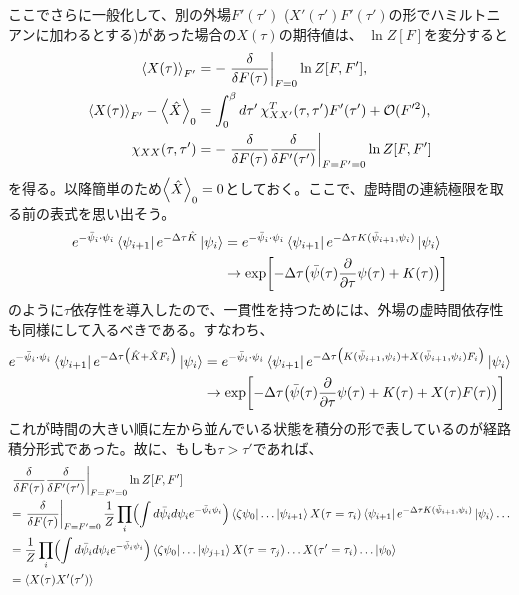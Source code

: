 \documentclass[a4paper,12pt]{jsarticle}
\newcommand{\p}{\partial}
\begin{document}
ここでさらに一般化して、別の外場$F'(\tau')$ ($X'(\tau')F'(\tau')$の形でハミルトニアンに加わるとする)があった場合の$X(\tau)$の期待値は、
$\ln Z[F]$を変分すると
\begin{align}
  \ev{X(\tau)}_{F'} &= -\left.\frac{\delta}{\delta F(\tau)}\right|_{F=0}\ln Z[F, F'],\\
  \ev{X(\tau)}_{F'}-\ev{\hat X}_0
    &= \int_0^\beta d\tau'\,\chi^T_{XX'}(\tau,\tau')F'(\tau')
       +\mathcal O(F'^2),\\
  \chi_{XX}(\tau,\tau')
    &= -\left.\frac{\delta}
      {\delta F(\tau)}\frac{\delta}
      {\delta F'(\tau')}\right|_{F=F'=0}\ln Z[F, F']
      \label{response_source_derivative}
\end{align}
を得る。以降簡単のため$\ev{\hat X}_0=0$としておく。ここで、虚時間の連続極限を取る前の表式を思い出そう。
\begin{align}
  e^{-\bar\psi_i\cdot\psi_i}\bra{\psi_{i+1}}e^{-\Delta\tau \hat{K}}\ket{\psi_i} &= e^{-\bar\psi_i\cdot\psi_i}\bra{\psi_{i+1}}e^{-\Delta\tau K(\bar\psi_{i+1}, \psi_i)}\ket{\psi_i}\nonumber\\
  &\rightarrow \exp[-\Delta\tau\bigl(\bar\psi(\tau)\frac{\p}{\p\tau}\psi(\tau)+K(\tau)\bigr)]
\end{align}
のように$\tau$依存性を導入したので、一貫性を持つためには、外場の虚時間依存性も同様にして入るべきである。すなわち、
\begin{align}
  e^{-\bar\psi_i\cdot\psi_i}\bra{\psi_{i+1}}e^{-\Delta\tau \bigl(\hat{K}+\hat{X}F_i \bigr) }\ket{\psi_i} &= e^{-\bar\psi_i\cdot\psi_i}\bra{\psi_{i+1}}e^{-\Delta\tau \bigl(K(\bar\psi_{i+1}, \psi_i)+ X(\bar\psi_{i+1}, \psi_i)F_i\bigr)}\ket{\psi_i}\nonumber\\
  &\rightarrow \exp[-\Delta\tau\bigl(\bar\psi(\tau)\frac{\p}{\p\tau}\psi(\tau)+K(\tau) + X(\tau)F(\tau)\bigr)]
\end{align}
これが時間の大きい順に左から並んでいる状態を積分の形で表しているのが経路積分形式であった。故に、もしも$\tau > \tau'$であれば、
\begin{align}
  &\left.\frac{\delta}{\delta F(\tau)}\frac{\delta}{\delta F'(\tau')}\right|_{F=F'=0}\ln Z[F, F']\nonumber\\
      & = \left.\frac{\delta}{\delta F(\tau)}\right|_{F=F'=0}\frac{1}{Z}\prod_i\Bigl(\int d\bar\psi_i d\psi_ie^{-\bar\psi_i\psi_i}\Bigr)  \bra{\zeta\psi_0}\dots\ket{\psi_{i+1}} X(\tau=\tau_i)\bra{\psi_{i+1}}e^{-\Delta\tau K(\bar\psi_{i+1}, \psi_i)}\ket{\psi_i} \dots\nonumber\\
      &= \frac{1}{Z}\prod_i\Bigl(\int d\bar\psi_i d\psi_ie^{-\bar\psi_i\psi_i}\Bigr) \bra{\zeta\psi_0}\dots\ket{\psi_{j+1}}X(\tau=\tau_j) \dots X(\tau'=\tau_i)\dots\ket{\psi_0}\\
      &= \ev{X(\tau)X'(\tau')} 
\end{align}
\end{document}
